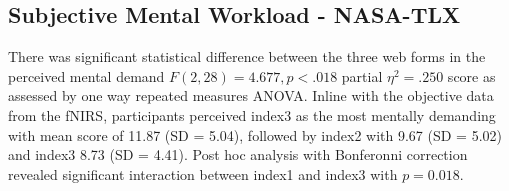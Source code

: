 \documentclass[../main/Feedback.tex]{subfiles}
\begin{document}
		
\subsection{Subjective Mental Workload - NASA-TLX}
There was significant statistical difference between the three web forms in the perceived mental demand $F(2,28)=4.677, p<.018$ partial $\eta^{2}=.250$ score as assessed by one way repeated measures ANOVA. 
Inline with the objective data from the fNIRS, participants perceived index3 as the most mentally demanding with mean score of 11.87 (SD = 5.04), followed by index2 with 9.67 (SD = 5.02) and index3 8.73 (SD = 4.41).
Post hoc analysis with Bonferonni correction revealed significant interaction between index1 and index3 with $p=0.018$.
		
\end{document}
